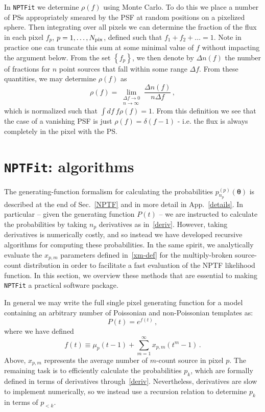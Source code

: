 In \texttt{NPTFit} we determine $\rho(f)$ using Monte Carlo. To do this we place a number of PSs appropriately smeared by the PSF at random positions on a pixelized sphere. Then integrating over all pixels we can determine the fraction of the flux in each pixel $f_p$, $p=1,\ldots, N_{\rm pix}$, defined such that $f_1+f_2+\ldots = 1$. Note in practice one can truncate this sum at some minimal value of $f$ without impacting the argument below. From the set $\left\{f_p \right\}$, we then denote by $\Delta n(f)$ the number of fractions for $n$ point sources that fall within some range $\Delta f$. From these quantities, we may determine $\rho(f)$ as
\begin{equation}
\rho(f) = \lim_{\substack{\Delta f \to 0 \\ n \to \infty}} \frac{\Delta n(f)}{n \Delta f}\,,
\end{equation}
which is normalized such that $\int df~f \rho(f) = 1$. From this definition we see that the case of a vanishing PSF is just $\rho(f) = \delta(f-1)$ - i.e. the flux is always completely in the pixel with the PS.

\section{\texttt{NPTFit}: algorithms}
\label{algorithms}

The generating-function formalism for calculating the probabilities $p_{n_p}^{(p)}({\bm \theta})$ is described at the end of Sec.~\ref{NPTF} and in more detail in App.~\ref{details}.  In particular -- given the generating function $P(t)$ -- we are instructed to calculate the probabilities by taking $n_p$ derivatives as in~\eqref{deriv}.  However, taking derivatives is numerically costly, and so instead we have developed recursive algorithms for computing these probabilities.  In the same spirit, we analytically evaluate the $x_{p,m}$ parameters defined in~\eqref{xm-def} for the multiply-broken source-count distribution in order to facilitate a fast evaluation of the NPTF likelihood function.  In this section, we overview these methods that are essential to making \texttt{NPTFit} a practical software package.   

In general we may write the full single pixel generating function for a model containing an arbitrary number of Poissonian and non-Poissonian templates as:
\begin{equation}
P(t) = e^{f(t)}\,,
\end{equation}
where we have defined
\begin{equation}
f(t) \equiv \mu_p(t-1) + \sum_{m=1}^{\infty} x_{p,m} (t^m - 1)\,.
\end{equation}
Above, $x_{p,m} $ represents the average number of $m$-count source in pixel $p$. The remaining task is to efficiently calculate the probabilities $p_k$, which are formally defined in terms of derivatives through~\eqref{deriv}. Nevertheless, derivatives are slow to implement numerically, so we instead use a recursion relation to determine $p_k$ in terms of $p_{< k}$.

